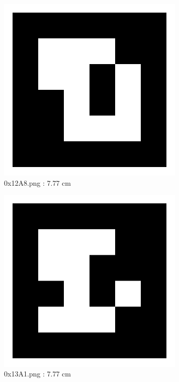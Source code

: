 \documentclass[11pt,a4,BCOR=0cm]{scrartcl}
\begin{document}
\begin{figure}
  \centering
    \includegraphics[natwidth=400,natheight=400,width=9cm]{0x12A8.png}
    \caption{0x12A8.png : 7.77 cm}
    \label{fig:0x12A8.png}
  
\end{figure} 

\clearpage

\begin{figure}
  \centering
    \includegraphics[natwidth=400,natheight=400,width=9cm]{0x13A1.png}
    \caption{0x13A1.png : 7.77 cm}
    \label{fig:0x13A1.png}
  
\end{figure} 
\end{document}
